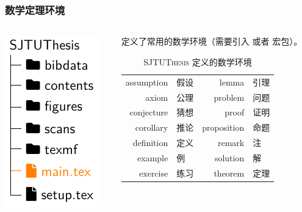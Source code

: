 \begin{frame}
  \frametitle{数学定理环境}
  \begin{columns}
    \begin{column}{0.4\textwidth}
      \includegraphics[page=6]{support/figures/thesisdir.pdf}
    \end{column}
    \begin{column}{0.6\textwidth}
      \SJTUThesis{} 定义了常用的数学环境（需要引入  或者  宏包）。

      \begin{table}
        \centering
        \caption{\textsc{SJTUThesis} 定义的数学环境}
        \footnotesize
        \begin{tabular}{>{\ttfamily}rl|>{\ttfamily}rl}
          \toprule
          assumption  & 假设  & lemma       & 引理 \\
          axiom       & 公理  & problem     & 问题 \\
          conjecture  & 猜想  & proof       & 证明 \\
          corollary   & 推论  & proposition & 命题 \\
          definition  & 定义  & remark      & 注   \\
          example     & 例    & solution    & 解   \\
          exercise    & 练习  & theorem     & 定理 \\
          \bottomrule
        \end{tabular}
      \end{table}
    \end{column}
  \end{columns}
\end{frame}

